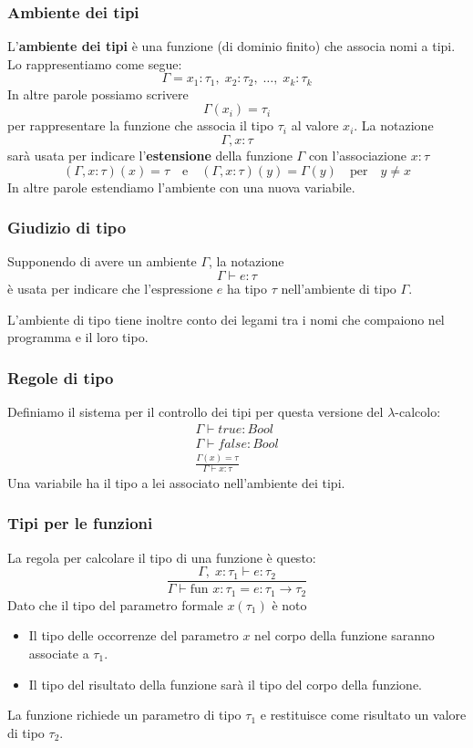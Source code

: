 \subsubsection{Ambiente dei tipi}
L'\textbf{ambiente dei tipi} è una funzione (di dominio finito) che associa nomi a tipi. Lo rappresentiamo come segue:
\[ \Gamma = x_1 : \tau_1, \; x_2 : \tau_2, \; \dots, \; x_k : \tau_k \]
In altre parole possiamo scrivere
\[ \Gamma (x_i) = \tau_i \]
per rappresentare la funzione che associa il tipo $\tau_i$ al valore $x_i$. La notazione
\[ \Gamma, x : \tau \]
sarà usata per indicare l'\textbf{estensione} della funzione $\Gamma$ con l'associazione $x : \tau$
\[ (\Gamma, x : \tau)(x) = \tau \quad \text{e} \quad (\Gamma, x : \tau)(y) = \Gamma(y) \quad \text{per} \quad y \neq x \]
In altre parole estendiamo l'ambiente con una nuova variabile.

\subsubsection{Giudizio di tipo}
Supponendo di avere un ambiente $\Gamma$, la notazione
\[ \Gamma \vdash e : \tau \]
è usata per indicare che l'espressione $e$ ha tipo $\tau$ nell'ambiente di tipo $\Gamma$.

L'ambiente di tipo tiene inoltre conto dei legami tra i nomi che compaiono nel programma e il loro tipo.

\subsubsection{Regole di tipo}
Definiamo il sistema per il controllo dei tipi per questa versione del $\lambda$-calcolo:
\begin{gather*}
	\Gamma \vdash true : Bool \\
	\Gamma \vdash false : Bool \\
	\frac{\Gamma (x) = \tau}{\Gamma \vdash x : \tau}
\end{gather*}
Una variabile ha il tipo a lei associato nell'ambiente dei tipi.

\subsubsection{Tipi per le funzioni}
La regola per calcolare il tipo di una funzione è questo:
\[ \frac{\Gamma, \; x : \tau_1 \vdash e : \tau_2}{\Gamma \vdash \text{fun } x : \tau_1 = e : \tau_1 \rightarrow \tau_2} \]
Dato che il tipo del parametro formale $x (\tau_1)$ è noto
\begin{itemize}
	\item Il tipo delle occorrenze del parametro $x$ nel corpo della funzione saranno associate a $\tau_1$.
	\item Il tipo del risultato della funzione sarà il tipo del corpo della funzione.
\end{itemize}
La funzione richiede un parametro di tipo $\tau_1$ e restituisce come risultato un valore di tipo $\tau_2$.

